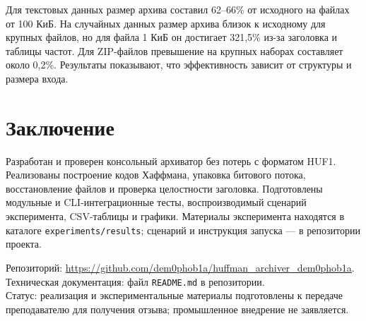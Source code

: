 \documentclass[a4paper]{article}
\begin{document}
Для текстовых данных размер архива составил 62--66\% от исходного на файлах от 100 КиБ. На случайных данных размер архива близок к исходному для крупных файлов, но для файла 1 КиБ он достигает 321,5\% из-за заголовка и таблицы частот. Для ZIP-файлов превышение на крупных наборах составляет около 0,2\%. Результаты показывают, что эффективность зависит от структуры и размера входа.

\section{Заключение}
Разработан и проверен консольный архиватор без потерь с форматом HUF1. Реализованы построение кодов Хаффмана, упаковка битового потока, восстановление файлов и проверка целостности заголовка. Подготовлены модульные и CLI-интеграционные тесты, воспроизводимый сценарий эксперимента, CSV-таблицы и графики. Материалы эксперимента находятся в каталоге \texttt{experiments/results}; сценарий и инструкция запуска --- в репозитории проекта.

Репозиторий: \url{https://github.com/dem0phob1a/huffman_archiver_dem0phob1a}.\\
Техническая документация: файл \texttt{README.md} в репозитории.\\
Статус: реализация и экспериментальные материалы подготовлены к передаче преподавателю для получения отзыва; промышленное внедрение не заявляется.
\end{document}
